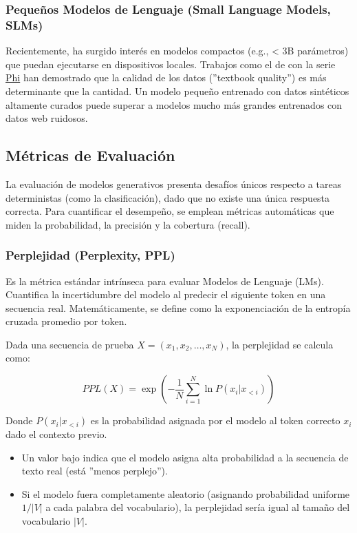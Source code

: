 \documentclass[11pt, a4paper]{article}
\begin{document}
\subsubsection{Pequeños Modelos de Lenguaje (Small Language Models, SLMs)}
Recientemente, ha surgido interés en modelos compactos (e.g., < 3B parámetros) que puedan ejecutarse en dispositivos locales. Trabajos como el de \cite{gunasekar_textbooks_2023} con la serie
\hyperlink{phi}{Phi} han demostrado que la calidad de los datos (''textbook quality'') es más determinante que la cantidad. Un modelo pequeño entrenado con datos sintéticos altamente curados puede superar a modelos
mucho más grandes entrenados con datos web ruidosos.

\subsection{Métricas de Evaluación}

La evaluación de modelos generativos presenta desafíos únicos respecto a tareas deterministas (como la clasificación), dado que no existe una única respuesta correcta. Para cuantificar el desempeño,
se emplean métricas automáticas que miden la probabilidad, la precisión y la cobertura (recall).

\subsubsection{Perplejidad (Perplexity, PPL)}
Es la métrica estándar intrínseca para evaluar Modelos de Lenguaje (LMs). Cuantifica la incertidumbre del modelo al predecir el siguiente token en una secuencia real. Matemáticamente, se define como
la exponenciación de la entropía cruzada promedio por token.

Dada una secuencia de prueba $X = (x_1, x_2, \dots, x_N)$, la perplejidad se calcula como:

\begin{equation}
    PPL(X) = \exp\left( -\frac{1}{N} \sum_{i=1}^{N} \ln P(x_i | x_{<i}) \right)
\end{equation}

Donde $P(x_i | x_{<i})$ es la probabilidad asignada por el modelo al token correcto $x_i$ dado el contexto previo.
\begin{itemize}
    \item Un valor bajo indica que el modelo asigna alta probabilidad a la secuencia de texto real (está ''menos perplejo'').
    \item Si el modelo fuera completamente aleatorio (asignando probabilidad uniforme $1/|V|$ a cada palabra del vocabulario), la perplejidad sería igual al tamaño del vocabulario $|V|$.
\end{itemize}
\end{document}
